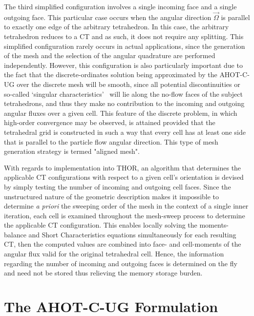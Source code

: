 The third simplified configuration involves a single incoming face and a single outgoing face.
This particular case occurs when the angular direction $\vec{\Omega}$ is parallel to exactly one edge of the arbitrary tetrahedron.
In this case, the arbitrary tetrahedron reduces to a \ac{CT} and as such, it does not require any splitting.
This simplified configuration rarely occurs in actual applications, since the generation of the mesh and the selection of the angular quadrature are performed independently.
However, this configuration is also particularly important due to the fact that the discrete-ordinates solution being approximated by the \ac{AHOT-C-UG} over the discrete mesh will be smooth, since all potential discontinuities or so-called ‘singular characteristics’~\cite{Duo2009} will lie along the no-flow faces of the subject tetrahedrons, and thus they make no contribution to the incoming and outgoing angular fluxes over a given cell.
This feature of the discrete problem, in which high-order convergence may be observed, is attained provided that the tetrahedral grid is constructed in such a way that every cell has at least one side that is parallel to the particle flow angular direction.
This type of mesh generation strategy is termed "aligned mesh".

With regards to implementation into \ac{THOR}, an algorithm that determines the applicable \ac{CT} configurations with respect to a given cell's orientation is devised by simply testing the number of incoming and outgoing cell faces.
Since the unstructured nature of the geometric description makes it impossible to determine \textit{a priori} the sweeping order of the mesh in the context of a single inner iteration, each cell is examined throughout the mesh-sweep process to determine the applicable \ac{CT} configuration.
This enables locally solving the moments-balance and Short Characteristics equations simultaneously for each resulting \ac{CT}, then the computed values are combined into face- and cell-moments of the angular flux valid for the original tetrahedral cell.
Hence, the information regarding the number of incoming and outgoing faces is determined on the fly and need not be stored thus relieving the memory storage burden.

\section{The \ac{AHOT-C-UG} Formulation}

